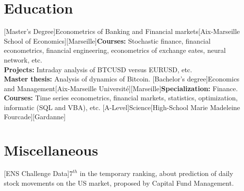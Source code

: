 \documentclass[a4paper]{arthur-cv-en}
\begin{document}
\begin{textblock}{20.5}
\begin{minipage}[t]{0.61\textwidth}
    \section{Education}
      \begin{rightenv}
        [Master's Degree]{Econometrics of Banking and Financial markets}[Aix-Marseille School of Economics][Marseille]{\textbf{Courses:} Stochastic finance, financial econometrics, financial engineering, econometrics of exchange eates, neural network, etc.\\\textbf{Projects:} Intraday analysis of BTCUSD versus EURUSD, etc.\\\textbf{Master thesis:} Analysis of dynamics of Bitcoin.}
        [Bachelor's degree]{Economics and Management}[Aix-Marseille Université][Marseille]{\textbf{Specialization:} Finance.\\\textbf{Courses:} Time series econometrics, financial markets, statistics, optimization, informatic (SQL and VBA), etc.}
        [A-Level]{Science}[High-School Marie Madeleine Fourcade][Gardanne]{}
      \end{rightenv}

    \section{Miscellaneous}
      \begin{rightenv}
        [ENS Challenge Data]{$7^{th}$ in the temporary ranking, about prediction of daily stock movements on the US market, proposed by Capital Fund Management.}
      \end{rightenv}

  \end{minipage}

\end{textblock}
\end{document}
